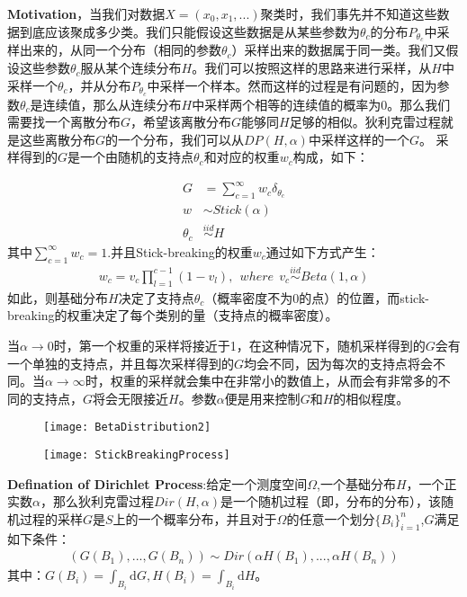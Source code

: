\textbf{Motivation}，当我们对数据$X=(x_0, x_1, ...)$聚类时，我们事先并不知道这些数据到底应该聚成多少类。我们只能假设这些数据是从某些参数为$\theta_{c}$的分布$P_{\theta_c}$中采样出来的，从同一个分布（相同的参数$\theta_c$）采样出来的数据属于同一类。我们又假设这些参数$\theta_c$服从某个连续分布$H$。我们可以按照这样的思路来进行采样，从$H$中采样一个$\theta_c$，并从分布$P_{\theta_c}$中采样一个样本。然而这样的过程是有问题的，因为参数$\theta_c$是连续值，那么从连续分布$H$中采样两个相等的连续值的概率为0。那么我们需要找一个离散分布$G$，希望该离散分布$G$能够同$H$足够的相似。狄利克雷过程就是这些离散分布$G$的一个分布，我们可以从$DP(H,\alpha)$中采样这样的一个$G$。
采样得到的$G$是一个由随机的支持点$\theta_c$和对应的权重$w_c$构成，如下：

\begin{displaymath}
\begin{split}
G&=\sum_{c=1}^{\infty}w_c\delta_{\theta_c}\\
w &\sim Stick(\alpha)\\
\theta_c &\overset{iid}{\sim}H
\end{split}
\end{displaymath}
其中$\sum_{c=1}^{\infty}w_c=1$.并且Stick-breaking的权重$w_c$通过如下方式产生：
\begin{displaymath}
\begin{split}
w_c = v_c \prod_{l=1}^{c-1}(1-v_l),~~where~~v_c \overset{iid}{\sim} Beta(1,\alpha)
\end{split}
\end{displaymath}
如此，则基础分布$H$决定了支持点$\theta_c$（概率密度不为0的点）的位置，而stick-breaking的权重决定了每个类别的量（支持点的概率密度）。

当$\alpha \to 0$时，第一个权重的采样将接近于1，在这种情况下，随机采样得到的$G$会有一个单独的支持点，并且每次采样得到的$G$均会不同，因为每次的支持点将会不同。当$\alpha \to \infty$时，权重的采样就会集中在非常小的数值上，从而会有非常多的不同的支持点，$G$将会无限接近$H$。参数$\alpha$便是用来控制$G$和$H$的相似程度。

\begin{figure}[htbp]
\centering
\texttt{[image: BetaDistribution2]}
\end{figure}

\begin{figure}[htbp]
\centering
\texttt{[image: StickBreakingProcess]}
\end{figure}

\textbf{Defination of Dirichlet Process}:给定一个测度空间$\Omega$,一个基础分布$H$，一个正实数$\alpha$，那么狄利克雷过程$Dir(H, \alpha)$是一个随机过程（即，分布的分布），该随机过程的采样$G$是$S$上的一个概率分布，并且对于$\Omega$的任意一个划分$\{B_i\}_{i=1}^{n}$,$G$满足如下条件：
\begin{displaymath}
\begin{split}
(G(B_1),...,G(B_n)) \sim Dir(\alpha H(B_1),...,\alpha H(B_n))
\end{split}
\end{displaymath}
其中：$G(B_i)=\int_{B_i} \mathrm{d} G, H(B_i) = \int_{B_i} \mathrm{d} H$。

